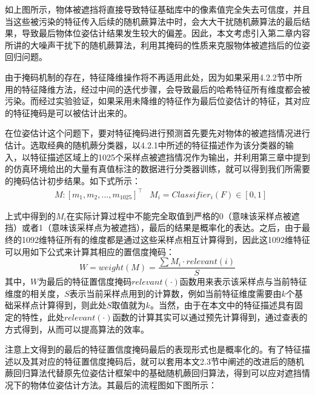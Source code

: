如上图所示，物体被遮挡将直接导致特征基础库中的像素值完全失去可信度，并且当这些被污染的特征传入后续的随机蕨算法中时，会大大干扰随机蕨算法的最后结果，导致最后物体位姿估计结果发生较大的偏差。因此，本文考虑引入第二章内容所讲的大噪声干扰下的随机蕨算法，利用其掩码的性质来克服物体被遮挡后的位姿回归问题。

由于掩码机制的存在，特征降维操作将不再适用此处，因为如果采用4.2.2节中所用的特征降维方法，经过中间的迭代步骤，会导致最后的哈希特征所有维度都会被污染。而经过实验验证，如果采用未降维的特征作为最后位姿估计的特征，其对应的特征掩码是可以被估计出来的。

在位姿估计这个问题下，要对特征掩码进行预测首先要先对物体的被遮挡情况进行估计。选取经典的随机蕨分类器，以4.2.1中所述的特征描述作为该分类器的输入，以特征描述区域上的1025个采样点被遮挡情况作为输出，并利用第三章中提到的仿真环境给出的大量有真值标注的数据进行分类器训练，就可以得到我们所需要的掩码估计初步结果。如下式所示：
\begin{equation}
\begin{aligned}
	& M: \left[m_1,m_2,...,m_1025\right]^\top
	& M_i=Classifier_i(F)\in[0,1]
\end{aligned}
\end{equation}

上式中得到的$M_i$在实际计算过程中不能完全取值到严格的0（意味该采样点被遮挡）或者1（意味该采样点为被遮挡），最后的结果是概率化的表达。之后，由于最终的1092维特征所有的维度都是通过这些采样点相互计算得到，因此这1092维特征可以用如下公式来计算其相应的置信度掩码：
\begin{equation}
	W=weight(M)=\frac{\sum M_i\cdot relevant(i)}{S}
\end{equation}
其中，$W$为最后的特征置信度掩码$relevant(\cdot)$函数用来表示该采样点与当前特征维度的相关度，$S$表示当前采样点用到的计算数，例如当前特征维度需要由$k$个基础采样点计算得到，则此处$S$取值就为$k$。当然，由于在本文中的特征描述具有固定的特性，此处$relevant(\cdot)$函数的计算其实可以通过预先计算得到，通过查表的方式得到，从而可以提高算法的效率。

注意上文得到的最后的特征置信度掩码最后的表现形式也是概率化的。有了特征描述以及其对应的特征置信度掩码后，就可以套用本文2.3节中阐述的改进后的随机蕨回归算法代替原先位姿估计框架中的基础随机蕨回归算法，得到可以应对遮挡情况下的物体位姿估计方法。其最后的流程图如下图所示：

